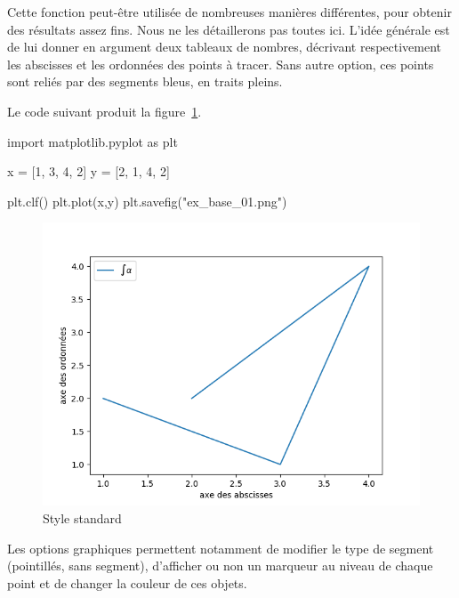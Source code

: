 Cette fonction peut-être utilisée de nombreuses manières différentes, pour obtenir des résultats assez fins. Nous ne les 
détaillerons pas toutes ici. 
L'idée générale est de lui donner en argument deux tableaux de nombres, décrivant respectivement les abscisses et les ordonnées des points à tracer. 
Sans autre option, ces points sont reliés par des segments bleus, en traits pleins. 
\begin{ex}
  Le code suivant produit la figure~\ref{fig:ex_base_01}.
\begin{pyverbatim}
import matplotlib.pyplot as plt

x = [1, 3, 4, 2]
y = [2, 1, 4, 2]

plt.clf()
plt.plot(x,y)
plt.savefig("ex_base_01.png")
\end{pyverbatim}
\begin{figure}[!h]
  \begin{center}
    \includegraphics[scale = 0.5]{ex_base_01}
    \caption{Style standard}
    \label{fig:ex_base_01}
  \end{center}
\end{figure}
\end{ex}
Les options graphiques permettent notamment de modifier le type de segment (pointillés, sans segment), d'afficher ou non un marqueur au niveau de chaque point et de changer la couleur de ces objets. 
